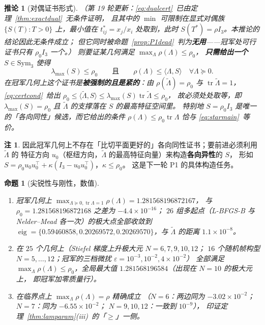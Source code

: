 \documentclass[UTF8,11pt]{ctexart}
\newtheorem{proposition}[theorem]{命题}
\newtheorem{corollary}[theorem]{推论}
\theoremstyle{definition}
\newtheorem{remark}[theorem]{注}
\newcommand{\Lam}{\Lambda}
\newcommand{\tr}{\operatorname{tr}}
\begin{document}
\begin{corollary}[对偶证书形式]\label{cor:dualcert}
（第 19 轮更新：\eqref{eq:dualcert}~已由定理~\ref{thm:exactdual}~无条件证明，
且其中的 $\min$ 可限制在显式对偶族 $\{S(T):T>0\}$ 上，最小值在
$t^*_{ij}=x_j/x_i$ 处取到，此时 $S(T^*)=\rho I_3$。本推论的结论因此无条件成立；
但它同时被命题~\ref{prop:P1dead}~判为\textbf{无用}——冠军处可行证书只有 $\rho_0I_3$ 一个。）
则要证某几何满足 $\max_\Lam\rho(\Lam)\le\rho_0$，
\textbf{只需给出一个} $S\in\mathrm{Sym}_3$ 使得
\begin{equation}\label{eq:certcond}
\lambda_{\max}(S)\le\rho_0\qquad\text{且}\qquad \rho(\Lam)\le\langle\Lam,S\rangle\quad\forall\Lam\succeq0 .
\end{equation}
在冠军几何上这个证书是\textbf{被强制的且是紧的}：由 $\rho(\tilde\Lam)=\rho_0$ 与 $\tr\tilde\Lam=1$，
\eqref{eq:certcond}~给出 $\rho_0\le\langle\tilde\Lam,S\rangle\le\lambda_{\max}(S)\tr\tilde\Lam\le\rho_0$，
故必须处处取等，即 $\lambda_{\max}(S)=\rho_0$ 且 $\tilde\Lam$ 的支撑落在 $S$ 的最高特征空间里。
特别地 $S=\rho_0I_3$ 是唯一的「各向同性」候选，而它给出的条件
$\rho(\Lam)\le\rho_0\tr\Lam$ 恰与 \eqref{eq:starmain}~等价。
\end{corollary}

\begin{remark}\label{rmk:certsearch}
因此冠军几何上不存在「比切平面更好的」各向同性证书；要前进必须利用 $\tilde\Lam$ 的
特征方向 $u_0$（枢纽方向，$\tilde\Lam$ 的最高特征向量）来构造\textbf{各向异性}的 $S$，
形如 $S=\rho_0u_0u_0^\top+\kappa(I_3-u_0u_0^\top)$，$\kappa\le\rho_0$。
这是下一轮 P1 的具体构造任务。
\end{remark}

\begin{proposition}[尖锐性与刚性，数值]\label{prop:r18sharp}
\begin{enumerate}\itemsep2pt
\item[(i)] 冠军几何上 $\max_{\Lam\succeq0,\tr\Lam=1}\rho(\Lam)=1.281568196872167$，
与 $\rho_0=1.281568196872168$ 之差为 $-4.4\times10^{-16}$；
$26$ 组多起点（L-BFGS-B 与 Nelder--Mead 各一次）的极大点全部收敛到
$\operatorname{eig}=\{0.59460858,0.20269572,0.20269570\}$，与 $\tilde\Lam$ 的距离 $1.1\times10^{-8}$。
\item[(ii)] 在 $25$ 个几何上（Stiefel 梯度上升极大元 $N=6,7,9,10,12$；
$16$ 个随机帧构型 $N=5,\dots,12$；冠军的三档微扰 $\varepsilon=10^{-3},10^{-2},4\times10^{-2}$）
全部满足 $\max_\Lam\rho(\Lam)\le\rho_0$，全局最大值 $1.281568196584$（出现在 $N=10$ 的极大元上，
即冠军加零质量行）。
\item[(iii)] 在临界点上 $\max_\Lam\rho(\Lam)=\rho$ 精确成立
（$N=6$：两边同为 $-3.02\times10^{-2}$；$N=7$：同为 $-6.55\times10^{-2}$；
$N=9,10,12$：一致到 $10^{-9}$），
印证定理~\ref{thm:lamparam}(iii)~的「$\ge$」一侧。
\end{enumerate}
\end{proposition}
\end{document}

